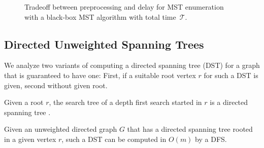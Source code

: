 \documentclass[a4paper, USenglish, cleveref, autoref, thm-restate]{lipics-v2021}
\newcommand{\cmark}{\ding{51}}
\newcommand{\xmark}{\ding{55}}
\newcommand{\maxdeg}{\Delta}
\newcommand{\totaltime}{\mathcal{T}}
\begin{document}
\begin{figure*}[t]
	\centering
	\caption{Tradeoff between preprocessing and delay for MST enumeration with a black-box MST algorithm with total time~$\totaltime$.}
	\label{fig:mst-summary}
\end{figure*}

\subsection{Directed Unweighted Spanning Trees}
\label{sec:dust}

We analyze two variants of computing a directed spanning tree (DST) for a graph that is guaranteed to have one:
First, if a suitable root vertex $r$ for such a DST is given, second without given root.

Given a root $r$, the search tree of a depth first search started in $r$ is a directed spanning tree \cite{cormenIntroductionAlgorithms2022}.

\begin{corollary}
	\label{cor:dst-with-r-upper}
	Given an unweighted directed graph $G$ that has a directed spanning tree rooted in a given vertex $r$, such a DST can be computed in $O(m)$ by a DFS.
\end{corollary}
\end{document}
